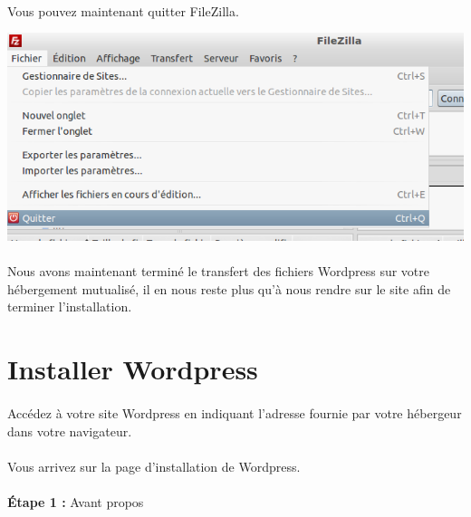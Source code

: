\documentclass[10pt,a4paper]{article}
\begin{document}
\paragraph{}Vous pouvez maintenant quitter FileZilla.
\begin{center}
\includegraphics[scale=0.35]{img/0039.png}
\end{center}
\paragraph{}Nous avons maintenant terminé le transfert des fichiers Wordpress sur votre hébergement mutualisé, il en nous reste plus qu'à nous rendre sur le site afin de terminer l'installation.
\newpage

\section{Installer Wordpress}
\paragraph{}Accédez à votre site Wordpress en indiquant l'adresse fournie par votre hébergeur dans votre navigateur.
\paragraph{}Vous arrivez sur la page d'installation de Wordpress.
\paragraph{}\textbf{Étape 1 : }Avant propos
\end{document}
